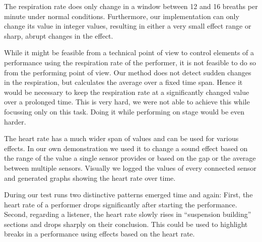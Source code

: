 \documentclass{sigchi-ext}
\begin{document}
The respiration rate does only change in a window between 12 and 16 breaths per minute under normal conditions.
Furthermore, our implementation can only change its value in integer values, resulting in either a very small
effect range or sharp, abrupt changes in the effect. %

While it might be feasible from a technical point of view to control elements of a performance using the respiration
rate of the performer, it is not feasible to do so from the performing point of view. Our method does not detect
sudden changes in the respiration, but calculates the average over a fixed time span. Hence it would be necessary
to keep the respiration rate at a significantly changed value over a prolonged time. This is very hard, we were
not able to achieve this while focussing only on this task. Doing it while performing on stage would be even harder.

The heart rate has a much wider span of values and can be used for various effects. In our own demonstration we used
it to change a sound effect based on the range of the value a single sensor provides or based on the gap or the average
between multiple sensors. Visually we logged the values of every connected sensor and generated graphs showing the
heart rate over time.

During our test runs two distinctive patterns emerged time and again: First, the heart rate of a performer
drops significantly after starting the performance. Second, regarding a listener, the heart rate slowly rises
in ``suspension building'' sections and drops sharply on their conclusion. This could be used to highlight
breaks in a performance using effects based on the heart rate.

\balance{} 



\end{document}
